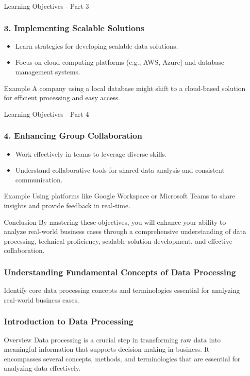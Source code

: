 \documentclass[aspectratio=169]{beamer}
\begin{document}
\begin{frame}{Learning Objectives - Part 3}
    \frametitle{3. Implementing Scalable Solutions}
    \begin{itemize}
        \item Learn strategies for developing scalable data solutions.
        \item Focus on cloud computing platforms (e.g., AWS, Azure) and database management systems.
    \end{itemize}

    \begin{block}{Example}
        A company using a local database might shift to a cloud-based solution for efficient processing and easy access.
    \end{block}
\end{frame}

\begin{frame}{Learning Objectives - Part 4}
    \frametitle{4. Enhancing Group Collaboration}
    \begin{itemize}
        \item Work effectively in teams to leverage diverse skills.
        \item Understand collaborative tools for shared data analysis and consistent communication.
    \end{itemize}

    \begin{block}{Example}
        Using platforms like Google Workspace or Microsoft Teams to share insights and provide feedback in real-time.
    \end{block}
\end{frame}

\begin{frame}{Conclusion}
    By mastering these objectives, you will enhance your ability to analyze real-world business cases through a comprehensive understanding of data processing, technical proficiency, scalable solution development, and effective collaboration.
\end{frame}

\begin{frame}[fragile]
    \frametitle{Understanding Fundamental Concepts of Data Processing}
    Identify core data processing concepts and terminologies essential for analyzing real-world business cases.
\end{frame}

\begin{frame}[fragile]
    \frametitle{Introduction to Data Processing}
    \begin{block}{Overview}
    Data processing is a crucial step in transforming raw data into meaningful information that supports decision-making in business. It encompasses several concepts, methods, and terminologies that are essential for analyzing data effectively.
    \end{block}
\end{frame}
\end{document}
